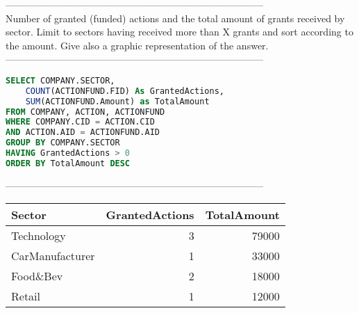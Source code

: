--------------------------------------------------------------------------------
\\Number of granted (funded) actions and the total amount of grants received by sector. Limit to sectors having received more than X grants and sort according to the amount. Give also a graphic representation of the answer.\\
--------------------------------------------------------------------------------
\begin{lstlisting}[language = SQL]
SELECT COMPANY.SECTOR,
	COUNT(ACTIONFUND.FID) As GrantedActions, 
	SUM(ACTIONFUND.Amount) as TotalAmount 
FROM COMPANY, ACTION, ACTIONFUND 
WHERE COMPANY.CID = ACTION.CID 
AND ACTION.AID = ACTIONFUND.AID 
GROUP BY COMPANY.SECTOR 
HAVING GrantedActions > 0 
ORDER BY TotalAmount DESC
\end{lstlisting}
--------------------------------------------------------------------------------
\\\begin{tabular}{lrr}
\toprule
 Sector          &   GrantedActions &   TotalAmount \\
\midrule
 Technology      &                3 &         79000 \\
 CarManufacturer &                1 &         33000 \\
 Food\&Bev        &                2 &         18000 \\
 Retail          &                1 &         12000 \\
\bottomrule
\end{tabular}